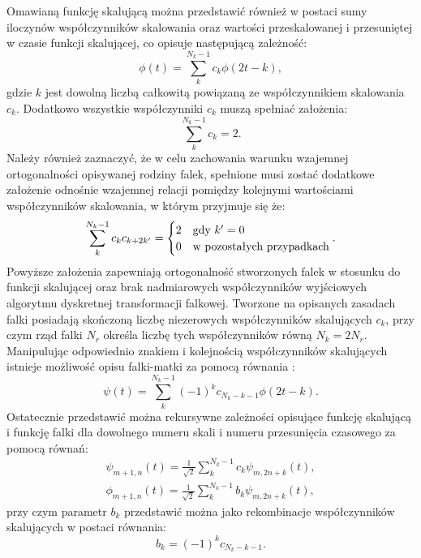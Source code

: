 Omawianą funkcję skalującą można przedstawić również w postaci sumy iloczynów współczynników skalowania oraz wartości przeskalowanej i przesuniętej w czasie funkcji skalującej, co opisuje następującą zależność:
\begin{equation}
\phi(t) = \sum _{k} ^{N_k-1} c_k \phi(2t - k) \label{eqn_dwt_scalefunrek},
\end{equation}
gdzie $k$ jest dowolną liczbą całkowitą powiązaną ze współczynnikiem skalowania $c_k$. Dodatkowo wszystkie współczynniki $c_k$ muszą spełniać założenia:
\begin{equation}
\sum _{k} ^{N_k-1} c_k = 2 \label{eqn_dwt_scalefunsum}.
\end{equation}
Należy również zaznaczyć, że w celu zachowania warunku wzajemnej ortogonalności opisywanej rodziny falek, spełnione musi zostać dodatkowe założenie odnośnie wzajemnej relacji pomiędzy kolejnymi wartościami współczynników skalowania, w którym przyjmuje się że:
\begin{equation}
\sum _{k} ^{N_k-1} c_k c_{k+2k'} =
\begin{cases}
	2 & $gdy$ ~ k' = 0 \\
	0 & $w pozostałych przypadkach$
\end{cases}
\label{eqn_dwt_scalemulort}.
\end{equation}
Powyższe założenia zapewniają ortogonalność stworzonych falek w stosunku do funkcji skalującej oraz brak nadmiarowych współczynników wyjściowych algorytmu dyskretnej transformacji falkowej. Tworzone na opisanych zasadach falki posiadają skończoną liczbę niezerowych współczynników skalujących $c_k$, przy czym rząd falki $N_r$ określa liczbę tych współczynników równą $N_k = 2 N_r$. Manipulując odpowiednio znakiem i kolejnością współczynników skalujących istnieje możliwość opisu falki-matki za pomocą równania \cite{wallen_handbook}:
\begin{equation}
\psi(t) = \sum _{k} ^{N_k-1} (-1)^k c_{N_k-k-1} \phi(2t - k) \label{eqn_dwt_waveletfunrek}.
\end{equation}
Ostatecznie przedstawić można rekursywne zależności opisujące funkcję skalującą i funkcję falki dla dowolnego numeru skali i numeru przesunięcia czasowego za pomocą równań:
\begin{gather}
\psi_{m+1,n}(t) = \frac{1}{\sqrt{2}} \sum _{k} ^{N_k-1} c_{k} \psi_{m,2n+k}(t) \label{eqn_dwt_fatherrek}, \\
\phi_{m+1,n}(t) = \frac{1}{\sqrt{2}} \sum _{k} ^{N_k-1} b_{k} \psi_{m,2n+k}(t) \label{eqn_dwt_matherrek},
\end{gather}
przy czym parametr $b_{k}$ przedstawić można jako rekombinacje współczynników skalujących w postaci równania:
\begin{equation}
b_{k} = (-1)^k c_{N_k-k-1} \label{eqn_dwt_bk}.
\end{equation}

